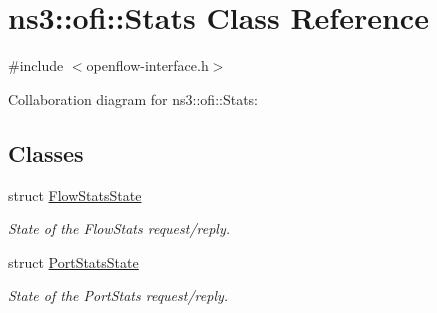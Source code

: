 \hypertarget{classns3_1_1ofi_1_1Stats}{}\section{ns3\+:\+:ofi\+:\+:Stats Class Reference}
\label{classns3_1_1ofi_1_1Stats}


{\ttfamily \#include $<$openflow-\/interface.\+h$>$}



Collaboration diagram for ns3\+:\+:ofi\+:\+:Stats\+:
\subsection*{Classes}
\begin{DoxyCompactItemize}
\item 
struct \hyperlink{structns3_1_1ofi_1_1Stats_1_1FlowStatsState}{Flow\+Stats\+State}
\begin{DoxyCompactList}\small\item\em State of the Flow\+Stats request/reply. \end{DoxyCompactList}\item 
struct \hyperlink{structns3_1_1ofi_1_1Stats_1_1PortStatsState}{Port\+Stats\+State}
\begin{DoxyCompactList}\small\item\em State of the Port\+Stats request/reply. \end{DoxyCompactList}\end{DoxyCompactItemize}
